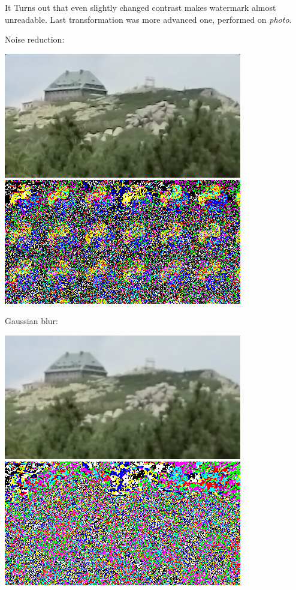 \documentclass{article}
\begin{document}
    	It Turns out that even slightly changed contrast makes watermark almost unreadable. Last transformation was more advanced one, performed on \textit{photo}.

    	Noise reduction:

    	\includegraphics[scale=0.6]{photo_lsb/watermarked_photo_reduction.png}
    	\includegraphics[scale=0.6]{photo_lsb/watermark_watermarked_photo_reduction.png}

    	Gaussian blur:

    	\includegraphics[scale=0.6]{photo_lsb/watermarked_photo_gaus.png}
    	\includegraphics[scale=0.6]{photo_lsb/watermark_watermarked_photo_gaus.png}
\end{document}
